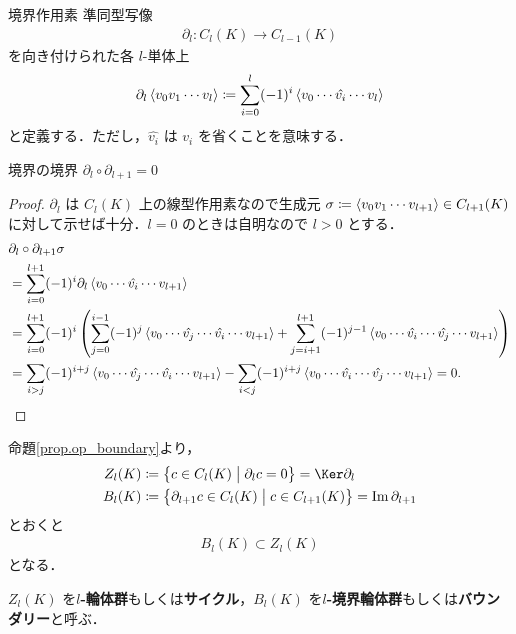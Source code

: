 \documentclass[geometry_main]{subfiles}
\begin{document}
\begin{mydef}[label=op_boundary]{境界作用素}
	準同型写像
	\begin{align} 
		\partial_l \colon C_l(K) \to C_{l-1}(K)
	\end{align}
	を向き付けられた各 $l$-単体上
	\begin{align} 
		\partial_l \expval{v_0 v_1 \cdots v_l} \coloneqq \sum_{i=0}^l (-1)^i \expval{v_0 \cdots \hat{v_i} \cdots v_l}
	\end{align}
	と定義する．ただし，$\hat{v_i}$ は $v_i$ を省くことを意味する．
\end{mydef}

\begin{myprop}[label=prop.op_boundary]{境界の境界} 
	$\partial_l \circ \partial_{l+1} = 0$
\end{myprop}

\begin{proof} 
	$\partial_l$ は $C_l(K)$ 上の線型作用素なので生成元 $\sigma \coloneqq \expval{v_0v_1 \cdots v_{l+1}} \in C_{l+1}(K)$ に対して示せば十分．$l = 0$ のときは自明なので $l > 0$ とする．
	\begin{align} 
		&\partial_l \circ \partial_{l+1} \sigma \\
		&= \sum_{i=0}^{l+1} (-1)^i \partial_l \expval{v_0 \cdots \hat{v_i} \cdots v_{l+1}} \\
		&= \sum_{i=0}^{l+1}(-1)^i \left(\sum_{j=0}^{i-1} (-1)^j \expval{v_0 \cdots \hat{v_j} \cdots \hat{v_i} \cdots v_{l+1}} + \sum_{j = i+1}^{l+1} (-1)^{j-1} \expval{v_0 \cdots \hat{v_i} \cdots \hat{v_j} \cdots v_{l+1}} \right) \\
		&= \sum_{i > j} (-1)^{i+j} \expval{v_0 \cdots \hat{v_j} \cdots \hat{v_i} \cdots v_{l+1}} - \sum_{i < j} (-1)^{i+j}\expval{v_0 \cdots \hat{v_i} \cdots \hat{v_j} \cdots v_{l+1}} = 0.
	\end{align}
\end{proof}

命題\ref{prop.op_boundary}より，
\begin{align} 
	Z_l (K) &\coloneqq \bigl\{ c \in C_l(K) \bigm| \partial_l c = 0 \bigr\} = \Ker \partial_l \\
	B_l (K) &\coloneqq \bigl\{ \partial_{l+1} c \in C_l(K) \bigm| c \in C_{l+1}(K) \bigr\} = \Im \partial_{l+1}
\end{align}
とおくと
\begin{align} 
	B_l(K) \subset Z_l(K)
\end{align}
となる．
\begin{marker} 
	$Z_l(K)$ を\textbf{$l$-輪体群}もしくは\textbf{サイクル}，$B_l(K)$ を\textbf{$l$-境界輪体群}もしくは\textbf{バウンダリー}と呼ぶ．
\end{marker}
\end{document}
